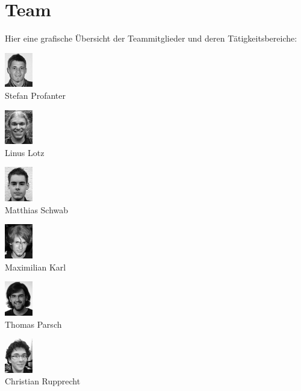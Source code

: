 \documentclass[12pt,a4paper]{article}
\begin{document}
\section{Team}
Hier eine grafische Übersicht der Teammitglieder und deren Tätigkeitsbereiche:\\
\begin{multicols}{2}{
\begin{list}{ }
	\item    \includegraphics[height=1.5cm]{./face_Fanter.png}     \\      Stefan Profanter	
	\item    \includegraphics[height=1.5cm]{./face_Lotz.png}       \\      Linus Lotz 
	\item    \includegraphics[height=1.5cm]{./face_Matthias.png}   \\      Matthias Schwab	
	\item    \includegraphics[height=1.5cm]{./face_Maxikay.png}    \\      Maximilian Karl
	\item    \includegraphics[height=1.5cm]{./face_Parsch.png}     \\      Thomas Parsch		
	\item 	\includegraphics[height=1.5cm]{./face_Rupprecht.png}   \\      Christian Rupprecht

\end{list}}
\end{multicols}
\end{document}
